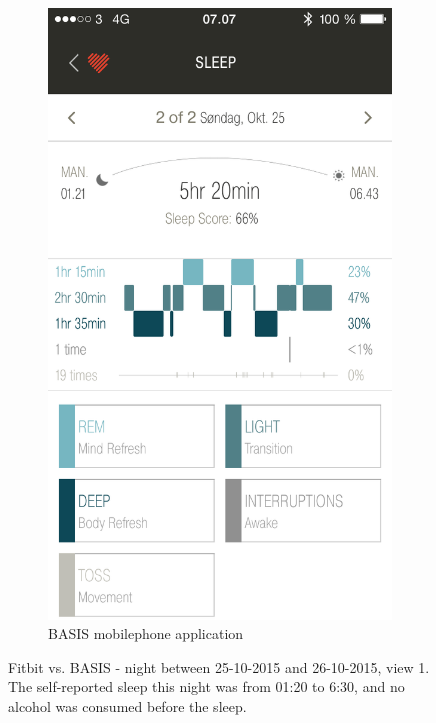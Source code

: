 \documentclass[12pt]{article} %
\begin{document}
\begin{figure}[H]
\begin{subfigure}[b]{0.45\textwidth}
        \includegraphics[width=\textwidth]{img/26-10-basis}
        \caption{BASIS mobilephone application}
        \label{fig:basis1}
    \end{subfigure}
    \caption{Fitbit vs. BASIS - night between 25-10-2015 and 26-10-2015, view 1. The self-reported sleep this night was from 01:20 to 6:30, and no alcohol was consumed before the sleep.}
    \label{fig:pilot1}
\end{figure}
\end{document}
